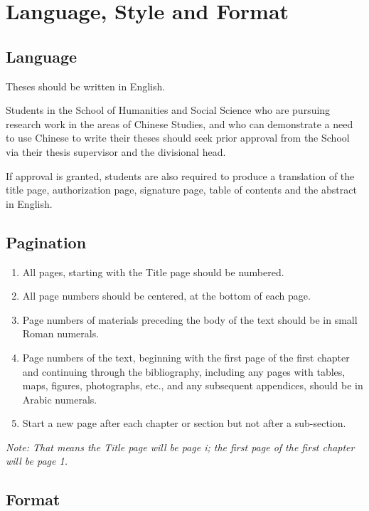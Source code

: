 \section{Language, Style and Format}

\subsection{Language}

Theses should be written in English.

Students in the School of Humanities and Social Science who are pursuing research work in the areas of Chinese Studies, and who can demonstrate a need to use Chinese to write their theses should seek prior approval from the School via their thesis supervisor and the divisional head.

If approval is granted, students are also required to produce a translation of the title page, authorization page, signature page, table of contents and the abstract in English.

\subsection{Pagination}

\begin{enumerate}
  \item All pages, starting with the Title page should be numbered.
  \item All page numbers should be centered, at the bottom of each page.
  \item Page numbers of materials preceding the body of the text should be in small Roman numerals.
  \item Page numbers of the text, beginning with the first page of the first chapter and continuing through the bibliography, including any pages with tables, maps, figures, photographs, etc., and any subsequent appendices, should be in Arabic numerals.
  \item Start a new page after each chapter or section but not after a sub-section.
\end{enumerate}

\emph{Note: That means the Title page will be page i; the first page of the first chapter will be page 1.}

\subsection{Format}

